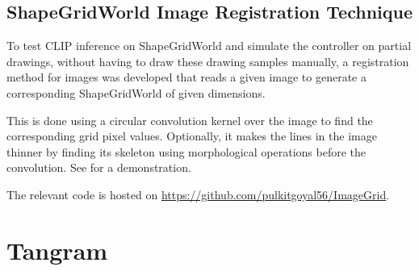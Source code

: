 \subsection{ShapeGridWorld Image Registration Technique}
\label{sec:sgw-registration}

To test CLIP inference on ShapeGridWorld and simulate the controller on partial drawings, without having to draw these drawing samples manually, a registration method for images was developed that reads a given image to generate a corresponding ShapeGridWorld of given dimensions.

This is done using a circular convolution kernel over the image to find the corresponding grid pixel values.
Optionally, it makes the lines in the image thinner by finding its skeleton using morphological operations before the convolution.
See  for a demonstration.


The relevant code is hosted on \url{https://github.com/pulkitgoyal56/ImageGrid}.

\newpage
\section{Tangram}
\label{sec:tangram-details}

